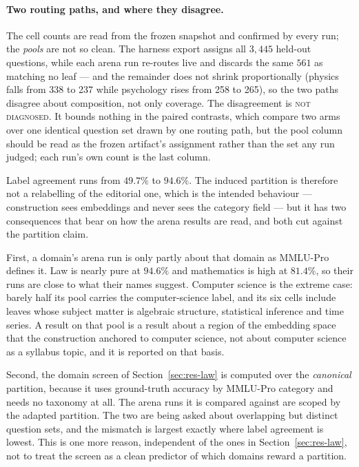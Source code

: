 \paragraph{Two routing paths, and where they disagree.} The cell
counts are read from the frozen snapshot and confirmed by every run;
the \emph{pools} are not so clean. The harness export assigns all
$3{,}445$ held-out questions, while each arena run re-routes live and
discards the same $561$ as matching no leaf --- and the remainder does
not shrink proportionally (physics falls from 338 to 237 while
psychology rises from 258 to 265), so the two paths disagree about
composition, not only coverage. The disagreement is \textsc{not
diagnosed}. It bounds nothing in the paired contrasts, which compare
two arms over one identical question set drawn by one routing path,
but the pool column should be read as the frozen artifact's
assignment rather than the set any run judged; each run's own count
is the last column.

Label agreement runs from $49.7\%$ to $94.6\%$.
The induced partition is therefore not a relabelling of the editorial
one, which is the intended behaviour --- construction sees embeddings
and never sees the category field --- but it has two consequences that
bear on how the arena results are read, and both cut against the
partition claim.

First, a domain's arena run is only partly about that domain as
MMLU-Pro defines it. Law is nearly pure at $94.6\%$ and mathematics is
high at $81.4\%$, so their runs are close to what their names suggest.
Computer science is the extreme case: barely half its pool carries the
computer-science label, and its six cells include leaves whose
subject matter is algebraic structure, statistical inference and time
series. A result on that pool is a result about a region of the
embedding space that the construction anchored to computer science,
not about computer science as a syllabus topic, and it is reported on
that basis.

Second, the domain screen of Section~\ref{sec:res-law} is computed
over the \emph{canonical} partition, because it uses ground-truth
accuracy by MMLU-Pro category and needs no taxonomy at all. The arena
runs it is compared against are scoped by the adapted partition. The
two are being asked about overlapping but distinct question sets, and
the mismatch is largest exactly where label agreement is lowest. This
is one more reason, independent of the ones in
Section~\ref{sec:res-law}, not to treat the screen as a clean
predictor of which domains reward a partition.

